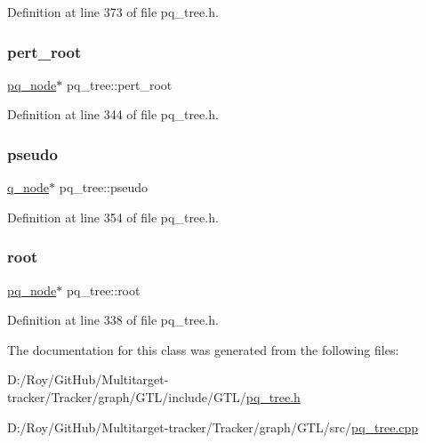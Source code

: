 Definition at line 373 of file pq\+\_\+tree.\+h.

\mbox{\label{classpq__tree_adf0d16ca5a29bfbe863efb525135ac01}} 
\subsubsection{\texorpdfstring{pert\+\_\+root}{pert\_root}}
{\footnotesize\ttfamily \mbox{\hyperlink{classpq__node}{pq\+\_\+node}}$\ast$ pq\+\_\+tree\+::pert\+\_\+root\hspace{0.3cm}{\ttfamily [private]}}



Definition at line 344 of file pq\+\_\+tree.\+h.

\mbox{\label{classpq__tree_a036ce0ebe9f5129d5c4ad930bbcc3e6f}} 
\subsubsection{\texorpdfstring{pseudo}{pseudo}}
{\footnotesize\ttfamily \mbox{\hyperlink{classq__node}{q\+\_\+node}}$\ast$ pq\+\_\+tree\+::pseudo\hspace{0.3cm}{\ttfamily [private]}}



Definition at line 354 of file pq\+\_\+tree.\+h.

\mbox{\label{classpq__tree_ad8e4e2235fe68fb99769cec54e1760ba}} 
\subsubsection{\texorpdfstring{root}{root}}
{\footnotesize\ttfamily \mbox{\hyperlink{classpq__node}{pq\+\_\+node}}$\ast$ pq\+\_\+tree\+::root\hspace{0.3cm}{\ttfamily [private]}}



Definition at line 338 of file pq\+\_\+tree.\+h.



The documentation for this class was generated from the following files\+:\begin{DoxyCompactItemize}
\item 
D\+:/\+Roy/\+Git\+Hub/\+Multitarget-\/tracker/\+Tracker/graph/\+G\+T\+L/include/\+G\+T\+L/\mbox{\hyperlink{pq__tree_8h}{pq\+\_\+tree.\+h}}\item 
D\+:/\+Roy/\+Git\+Hub/\+Multitarget-\/tracker/\+Tracker/graph/\+G\+T\+L/src/\mbox{\hyperlink{pq__tree_8cpp}{pq\+\_\+tree.\+cpp}}\end{DoxyCompactItemize}

